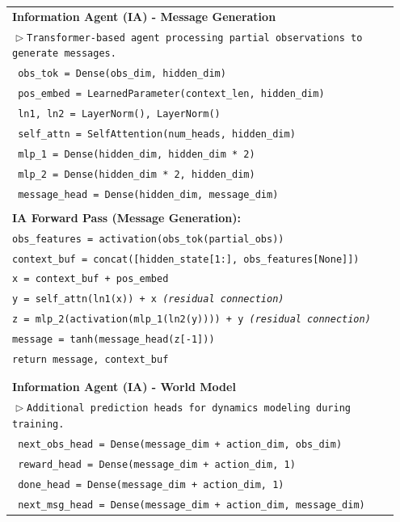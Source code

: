 \documentclass[letterpaper]{article}
\begin{document}
\begin{appendix}
\begin{table}[!htbp]
\begin{tabular}{@{}p{0.95\linewidth}@{}}
\textbf{Information Agent (IA) - Message Generation} \\
\texttt{$\vartriangleright$\hspace{0.5em}Transformer-based agent processing partial observations to generate messages.} \\
\texttt{  obs\_tok = Dense(obs\_dim, hidden\_dim)} \\
\texttt{  pos\_embed = LearnedParameter(context\_len, hidden\_dim)} \\
\texttt{  ln1, ln2 = LayerNorm(), LayerNorm()} \\
\texttt{  self\_attn = SelfAttention(num\_heads, hidden\_dim)} \\
\texttt{  mlp\_1 = Dense(hidden\_dim, hidden\_dim * 2)} \\
\texttt{  mlp\_2 = Dense(hidden\_dim * 2, hidden\_dim)} \\
\texttt{  message\_head = Dense(hidden\_dim, message\_dim)} \\
\\
\textbf{IA Forward Pass (Message Generation):} \\
\texttt{obs\_features = activation(obs\_tok(partial\_obs))} \\
\texttt{context\_buf = concat([hidden\_state[1:], obs\_features[None]])} \\
\texttt{x = context\_buf + pos\_embed} \\
\texttt{y = self\_attn(ln1(x)) + x  \quad \textit{(residual connection)}} \\
\texttt{z = mlp\_2(activation(mlp\_1(ln2(y)))) + y  \quad \textit{(residual connection)}} \\
\texttt{message = tanh(message\_head(z[-1]))} \\
\texttt{return message, context\_buf} \\
\\ \hline \\
\textbf{Information Agent (IA) - World Model} \\
\texttt{$\vartriangleright$\hspace{0.5em}Additional prediction heads for dynamics modeling during training.} \\
\texttt{  next\_obs\_head = Dense(message\_dim + action\_dim, obs\_dim)} \\
\texttt{  reward\_head = Dense(message\_dim + action\_dim, 1)} \\
\texttt{  done\_head = Dense(message\_dim + action\_dim, 1)} \\
\texttt{  next\_msg\_head = Dense(message\_dim + action\_dim, message\_dim)} \\

\end{tabular}
\end{table}
\end{appendix}
\end{document}

